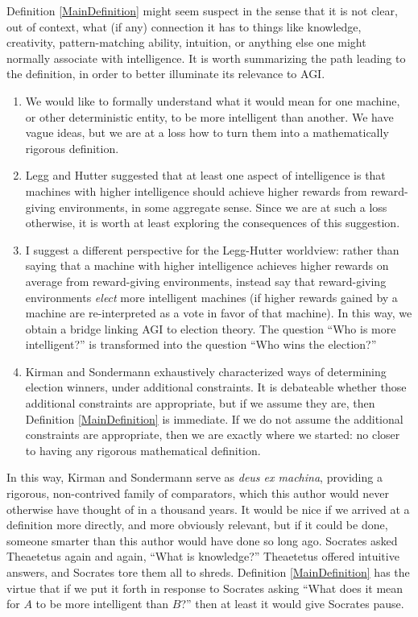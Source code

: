 \documentclass[twoside,11pt]{article}
\begin{document}
Definition \ref{MainDefinition} might seem suspect in the sense that it is not
clear, out of context, what (if any) connection it has to things like knowledge,
creativity, pattern-matching ability, intuition, or anything else one might
normally associate with intelligence. It is worth summarizing the path leading to
the definition, in order to better illuminate its relevance to AGI.
\begin{enumerate}
    \item
    We would like to formally understand what it would mean for one machine, or
    other deterministic entity, to be more intelligent than another.
    We have vague ideas, but we are at a loss how
    to turn them into a mathematically rigorous definition.
    \item
    Legg and Hutter suggested that at least one aspect of intelligence is that
    machines with higher intelligence should achieve higher rewards from
    reward-giving environments, in some aggregate sense. Since we are at such
    a loss otherwise, it is worth at least exploring the consequences of this
    suggestion.
    \item
    I suggest a different perspective for the Legg-Hutter worldview: rather
    than saying that a machine with higher intelligence achieves higher rewards
    on average from reward-giving environments, instead say that reward-giving
    environments \emph{elect} more intelligent machines (if higher rewards gained
    by a machine are re-interpreted as a vote in favor of that machine). In this
    way, we obtain a bridge linking AGI to election theory. The question ``Who
    is more intelligent?'' is transformed into the question ``Who wins the election?''
    \item
    Kirman and Sondermann exhaustively characterized ways of determining election
    winners, under additional constraints. It is debateable whether those
    additional constraints are appropriate, but if we assume they are,
    then Definition \ref{MainDefinition} is immediate. If we do not assume
    the additional constraints are
    appropriate, then we are exactly where we started: no closer to having any
    rigorous mathematical definition.
\end{enumerate}
In this way, Kirman and Sondermann serve as \emph{deus ex machina}, providing
a rigorous, non-contrived family of comparators, which this author would never otherwise
have thought of in a thousand years. It would be nice if we arrived
at a definition more directly, and more obviously relevant,
but if it could be done, someone smarter
than this author would have done so long ago.
Socrates asked Theaetetus again and again,
``What is
knowledge?'' Theaetetus offered intuitive answers, and Socrates tore them
all to shreds. Definition \ref{MainDefinition} has the virtue that
if we put it forth in response to Socrates asking ``What does it mean for $A$ to
be more intelligent than $B$?'' then at least it would give Socrates pause.
\end{document}
